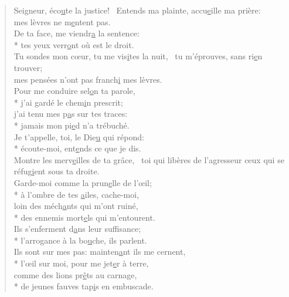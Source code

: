 
\begin{verse}
Seigneur, éco\underline{u}te la justice!~\psalmdagger
Entends ma plainte, accu\underline{e}ille ma prière: \\
mes lèvres ne m\underline{e}ntent pas. \\

De ta face, me viendr\underline{a} la sentence: \\*
tes yeux verr\underline{o}nt où est le droit. \\

Tu sondes mon cœur, tu me vis\underline{i}tes la nuit,~\psalmdagger
tu m’éprouves, sans ri\underline{e}n trouver; \\
mes pensées n’ont pas franch\underline{i} mes lèvres. \\

Pour me conduire sel\underline{o}n ta parole, \\*
j’ai gardé le chem\underline{i}n prescrit; \\
j’ai tenu mes p\underline{a}s sur tes traces: \\*
jamais mon pi\underline{e}d n’a trébuché. \\

Je t’appelle, toi, le Die\underline{u} qui répond: \\*
écoute-moi, ent\underline{e}nds ce que je dis. \\

Montre les merv\underline{e}illes de ta grâce,~\psalmstar
toi qui libères de l’agresseur
ceux qui se réfug\underline{i}ent sous ta droite. \\

Garde-moi comme la prun\underline{e}lle de l’œil; \\*
à l’ombre de tes \underline{a}iles, cache-moi, \\
loin des méch\underline{a}nts qui m’ont ruiné, \\*
des ennemis mort\underline{e}ls qui m’entourent. \\

Ils s’enferment d\underline{a}ns leur suffisance; \\*
l’arrogance à la bo\underline{u}che, ils parlent. \\

Ils sont sur mes pas: mainten\underline{a}nt ils me cernent, \\*
l’œil sur moi, pour me jet\underline{e}r à terre, \\
comme des lions pr\underline{ê}ts au carnage, \\*
de jeunes fauves tap\underline{i}s en embuscade. \\


\end{verse}
